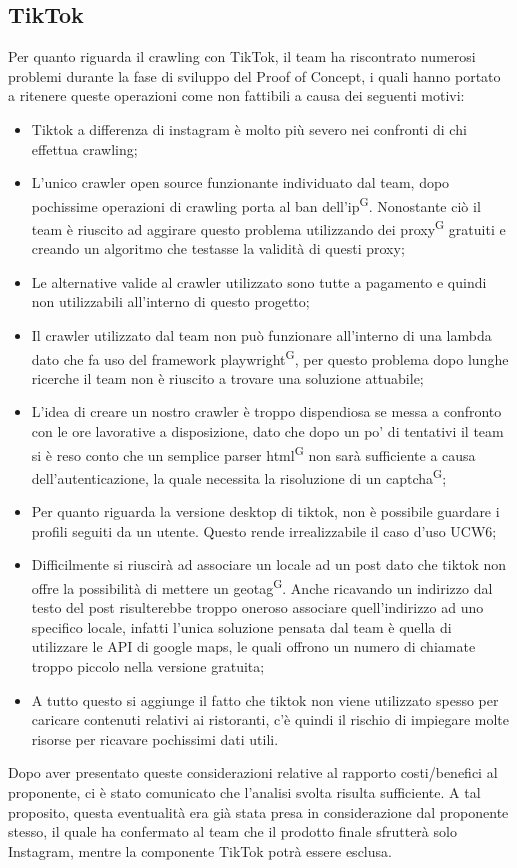 \subsection{TikTok}
Per quanto riguarda il crawling con TikTok, il team ha riscontrato numerosi problemi durante la fase di sviluppo del Proof of Concept, i quali hanno portato a ritenere queste operazioni come non fattibili a causa dei seguenti motivi:
\begin{itemize}
    \item Tiktok a differenza di instagram è molto più severo nei confronti di chi effettua crawling;
    \item L'unico crawler open source funzionante individuato dal team, dopo pochissime operazioni di crawling porta al ban dell'ip\textsuperscript{G}. Nonostante ciò il team è riuscito ad aggirare questo problema utilizzando dei proxy\textsuperscript{G} gratuiti e creando un algoritmo che testasse la validità di questi proxy;
    \item Le alternative valide al crawler utilizzato sono tutte a pagamento e quindi non utilizzabili all'interno di questo progetto;
    \item Il crawler utilizzato dal team non può funzionare all'interno di una lambda dato che fa uso del framework playwright\textsuperscript{G}, per questo problema dopo lunghe ricerche il team non è riuscito a trovare una soluzione attuabile;
    \item L'idea di creare un nostro crawler è troppo dispendiosa se messa a confronto con le ore lavorative a disposizione, dato che dopo un po' di tentativi il team si è reso conto che un semplice parser html\textsuperscript{G} non sarà sufficiente a causa dell'autenticazione, la quale necessita la risoluzione di un captcha\textsuperscript{G};
    \item Per quanto riguarda la versione desktop di tiktok, non è possibile guardare i profili seguiti da un utente. Questo rende irrealizzabile il caso d'uso UCW6;
    \item Difficilmente si riuscirà ad associare un locale ad un post dato che tiktok non offre la possibilità di mettere un geotag\textsuperscript{G}. Anche ricavando un indirizzo dal testo del post risulterebbe troppo oneroso associare quell'indirizzo ad uno specifico locale, infatti l'unica soluzione pensata dal team è quella di utilizzare le API di google maps, le quali offrono un numero di chiamate troppo piccolo nella versione gratuita;
    \item A tutto questo si aggiunge il fatto che tiktok non viene utilizzato spesso per caricare contenuti relativi ai ristoranti, c’è quindi il rischio di impiegare molte risorse per ricavare pochissimi dati utili.
\end{itemize}
Dopo aver presentato queste considerazioni relative al rapporto costi/benefici al proponente, ci è stato comunicato che l’analisi svolta risulta sufficiente. A tal proposito,  questa eventualità era già stata presa in considerazione dal proponente stesso, il quale ha confermato al team che il prodotto finale sfrutterà solo Instagram, mentre la componente TikTok potrà essere esclusa.